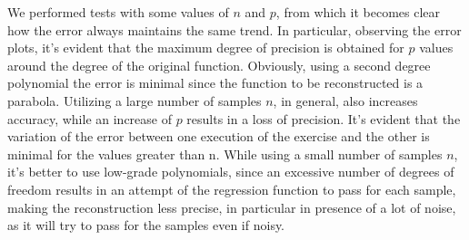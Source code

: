 We performed tests with some values of $ n $ and $ p $, from which it becomes clear how the error always maintains the same trend.
In particular, observing the error plots, it's evident that the maximum degree of precision is obtained for $p$ values around the degree of the original function. Obviously, using a second degree polynomial the error is minimal since the function to be reconstructed is a parabola.
Utilizing a large number of samples $n$, in general, also increases accuracy, while an increase of $p$ results in a loss of precision.
It's evident that the variation of the error between one execution of the exercise and the other is minimal for the values greater than n.
While using a small number of samples $n$, it's better to use low-grade polynomials, since an excessive number of degrees of freedom results in an attempt of the regression function to pass for each sample, making the reconstruction less precise, in particular in presence of a lot of noise, as it will try to pass for the samples even if noisy.











